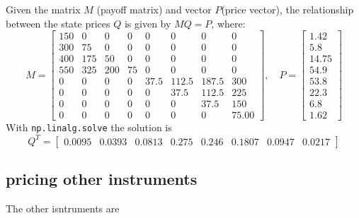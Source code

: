 \documentclass{article}
\begin{document}
Given the matrix \( M \) (payoff matrix)
and vector \( P \)(price vector),
the relationship between the state prices \( Q \) is given by \(MQ = P\),
where:
\[
    M = \begin{bmatrix}
        150 & 0   & 0   & 0  & 0    & 0     & 0     & 0     \\
        300 & 75  & 0   & 0  & 0    & 0     & 0     & 0     \\
        400 & 175 & 50  & 0  & 0    & 0     & 0     & 0     \\
        550 & 325 & 200 & 75 & 0    & 0     & 0     & 0     \\
        0   & 0   & 0   & 0  & 37.5 & 112.5 & 187.5 & 300   \\
        0   & 0   & 0   & 0  & 0    & 37.5  & 112.5 & 225   \\
        0   & 0   & 0   & 0  & 0    & 0     & 37.5  & 150   \\
        0   & 0   & 0   & 0  & 0    & 0     & 0     & 75.00
    \end{bmatrix},
    \quad P = \begin{bmatrix}
        1.42  \\
        5.8   \\
        14.75 \\
        54.9  \\
        53.8  \\
        22.3  \\
        6.8   \\
        1.62
    \end{bmatrix}
\]
With \verb|np.linalg.solve| the solution is
\[
    Q^T = \begin{bmatrix} 0.0095 & 0.0393 & 0.0813 & 0.275 & 0.246 & 0.1807 & 0.0947 & 0.0217 \end{bmatrix}
\]

\subsection*{pricing other instruments}
The other isntruments are
\end{document}
